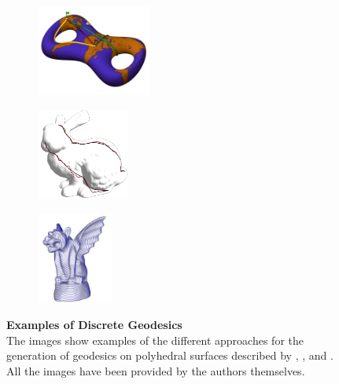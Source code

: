 \documentclass{stdlocal}
\begin{document}
\begin{figure}[b]
  \centering
  \begin{subfigure}[t]{0.30\linewidth}
    \centering
    \includegraphics[height=3cm]{images/polthier2006-1.png}
    \caption{\textcite{polthier2006}}
    \label{fig:polthier2006}
  \end{subfigure}
  \begin{subfigure}[t]{0.38\linewidth}
    \centering
    \includegraphics[height=3cm]{images/martinez2005-1.png}
    \caption{\textcite{martinez2005}}
    \label{fig:martinez2005}
  \end{subfigure}
  \begin{subfigure}[t]{0.30\linewidth}
    \centering
    \includegraphics[height=3cm]{images/surazhsky2005-1.png}
    \caption{\textcite{surazhsky2005}}
    \label{fig:surazhsky2005}
  \end{subfigure}
  \caption[Examples of Discrete Geodesics]{%
    \textbf{Examples of Discrete Geodesics}\\
    The images show examples of the different approaches for the generation of geodesics on polyhedral surfaces described by \textcite{polthier2006}, \textcite{martinez2005}, and \textcite{surazhsky2005}.
    All the images have been provided by the authors themselves.
  }
  \label{fig:related-work-geodesics}
\end{figure}
\end{document}
